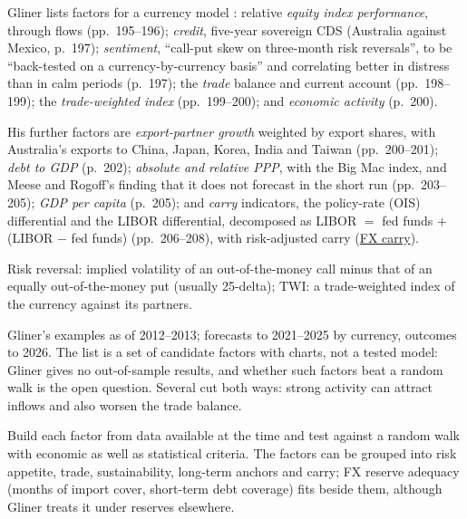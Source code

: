 \begin{qfmethod}\label{meth:fx-valuation-signals}
 Gliner lists factors for a currency model \citep[chap.~7, sec.\ ``Valuation Techniques for Foreign Exchange'', PDF pp.~195--209]{s7-gliner}: relative \emph{equity index performance}, through flows (pp.~195--196); \emph{credit}, five-year sovereign CDS (Australia against Mexico, p.~197); \emph{sentiment}, ``call-put skew on three-month risk reversals'', to be ``back-tested on a currency-by-currency basis'' and correlating better in distress than in calm periods (p.~197); the \emph{trade} balance and current account (pp.~198--199); the \emph{trade-weighted index} (pp.~199--200); and \emph{economic activity} (p.~200).

His further factors are \emph{export-partner growth} weighted by export shares, with Australia's exports to China, Japan, Korea, India and Taiwan (pp.~200--201); \emph{debt to GDP} (p.~202); \emph{absolute and relative PPP}, with the Big Mac index, and Meese and Rogoff's finding that it does not forecast in the short run (pp.~203--205); \emph{GDP per capita} (p.~205); and \emph{carry} indicators, the policy-rate (OIS) differential and the LIBOR differential, decomposed as LIBOR $=$ fed funds $+$ (LIBOR $-$ fed funds) (pp.~206--208), with risk-adjusted carry (\hyperref[mod:fx-carry-trade]{FX carry}).

 Risk reversal: implied volatility of an out-of-the-money call minus that of an equally out-of-the-money put (usually 25-delta); TWI: a trade-weighted index of the currency against its partners.

 Gliner's examples as of 2012--2013; forecasts to 2021--2025 by currency, outcomes to 2026. The list is a set of candidate factors with charts, not a tested model: Gliner gives no out-of-sample results, and whether such factors beat a random walk is the open question. Several cut both ways: strong activity can attract inflows and also worsen the trade balance.

 Build each factor from data available at the time and test against a random walk with economic as well as statistical criteria. The factors can be grouped into risk appetite, trade, sustainability, long-term anchors and carry; FX reserve adequacy (months of import cover, short-term debt coverage) fits beside them, although Gliner treats it under reserves elsewhere.


\end{qfmethod}
